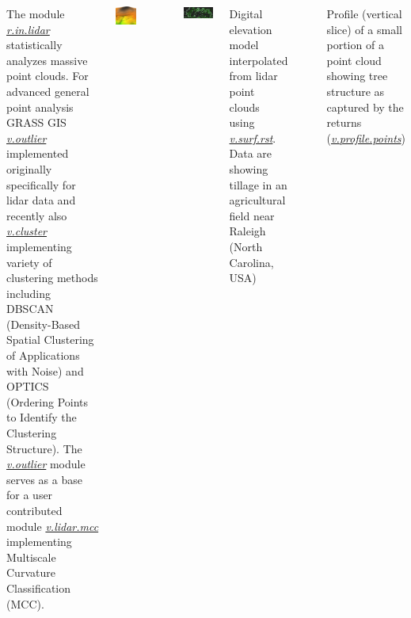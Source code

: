 \documentclass[25pt, margin=0mm, innermargin=25mm, blockverticalspace=25mm, colspace=25mm, subcolspace=8mm]{tikzposter}
\newcommand{\gmodule}[1]{\href{http://grass.osgeo.org/grass72/manuals/#1.html}{\emph{#1}}}
\newcommand{\gamodule}[1]{\href{http://grass.osgeo.org/grass72/manuals/addons/#1.html}{\emph{#1}}}
\begin{document}
\begin{columns}
{The module \gmodule{r.in.lidar} statistically analyzes massive point clouds.
For advanced general point analysis GRASS GIS
\gmodule{v.outlier} implemented originally specifically for lidar data
and recently also \gmodule{v.cluster}
implementing variety of clustering methods including
DBSCAN (Density-Based Spatial Clustering of Applications with Noise)
and OPTICS (Ordering Points to Identify the Clustering Structure).
The \gmodule{v.outlier} module serves as a base for a user contributed module \gamodule{v.lidar.mcc}
implementing Multiscale Curvature Classification (MCC).


\centering
\begin{minipage}{0.48\linewidth}
\centering
\includegraphics[width=0.7\textwidth]{elevation_lidar}
\end{minipage}
~
\begin{minipage}{0.48\linewidth}
\centering
\includegraphics[width=\textwidth]{lidar_profile}
\end{minipage}

\bigskip

\begin{minipage}{0.48\linewidth}
\centering
Digital elevation model interpolated from lidar point clouds
using \gmodule{v.surf.rst}. Data are showing tillage in an agricultural field near Raleigh (North Carolina, USA)
\end{minipage}
~
\begin{minipage}{0.48\linewidth}
\centering
Profile (vertical slice) of a small portion of a point cloud showing tree structure as captured by the returns
(\gamodule{v.profile.points})
\end{minipage}

}



\end{columns}
\end{document}
